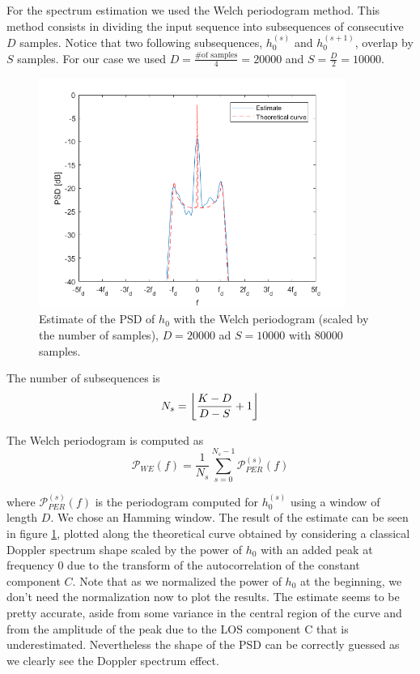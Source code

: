 \documentclass[a4paper,11.5pt]{article}
\DeclarePairedDelimiter{\floor}{\lfloor}{\rfloor}
\begin{document}
For the spectrum estimation we used the Welch periodogram method. This method consists in dividing the input sequence into subsequences of consecutive $D$ samples. Notice that two following subsequences, $h_0^{(s)}$ and $h_0^{(s+1)}$, overlap by $S$ samples. For our case we used $D =\frac{ \mbox{\# of samples}}{ 4}=20000$ and $S = \frac{D}{2}=10000$. \\


\begin{figure}[ht]
	\begin{center}    
		\includegraphics[width=10cm]{figs/PSD-est.png}
		\caption{Estimate of the PSD of $h_0$ with the Welch periodogram (scaled by the number of samples), $D=20000$ ad $S=10000$ with $80000$ samples.}
		\label{fig:PSD}
	\end{center}
\end{figure}
The number of subsequences is
\begin{equation}
N_s = \floor*{{\frac{K-D}{D-S}+1}}
\end{equation}

The Welch periodogram is computed as
\begin{equation}
\mathcal{P}_{WE}(f) = \frac{1}{N_s}\sum_{s=0}^{N_s-1}{\mathcal{P}}_{PER}^{(s)}(f)
\end{equation}

where ${\mathcal{P}}_{PER}^{(s)}(f)$ is the periodogram computed for $h_0^{(s)}$ using a window of length $D$. We chose an Hamming window. The result of the estimate can be seen in figure \ref{fig:PSD}, plotted along the theoretical curve obtained by considering a classical Doppler spectrum shape scaled by the power of $h_0$ with an added peak at frequency 0 due to the transform of the autocorrelation of the constant component $C$. Note that as we normalized the power of $h_0$ at the beginning, we don't need the normalization now to plot the results. The estimate seems to be pretty accurate, aside from some variance in the central region of the curve and from the amplitude of the peak due to the LOS component C that is underestimated. Nevertheless the shape of the PSD can be correctly guessed as we clearly see the Doppler spectrum effect.
\end{document}
